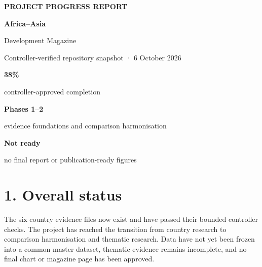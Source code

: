 \documentclass[10pt,a4paper]{article}
\begin{document}
\vspace*{14mm}
{\fontsize{11}{13}\selectfont\bfseries\color{terracotta} PROJECT PROGRESS REPORT}\par
\vspace{4mm}
{\fontsize{29}{32}\selectfont\bfseries Africa--Asia\par Development Magazine}\par
\vspace{5mm}
{\large\color{muted}Controller-verified repository snapshot · 6 October 2026}\par
\vspace{15mm}

\begin{minipage}[t]{0.31\linewidth}
{\fontsize{25}{27}\selectfont\bfseries\color{terracotta}38\%}\par
{\small controller-approved completion}
\end{minipage}\hfill
\begin{minipage}[t]{0.31\linewidth}
{\fontsize{18}{21}\selectfont\bfseries\color{blue}Phases 1--2}\par
{\small evidence foundations and comparison harmonisation}
\end{minipage}\hfill
\begin{minipage}[t]{0.31\linewidth}
{\fontsize{18}{21}\selectfont\bfseries\color{terracotta}Not ready}\par
{\small no final report or publication-ready figures}
\end{minipage}

\section{1. Overall status}

The six country evidence files now exist and have passed their bounded controller checks. The project has reached the transition from country research to comparison harmonisation and thematic research. Data have not yet been frozen into a common master dataset, thematic evidence remains incomplete, and no final chart or magazine page has been approved.
\end{document}
